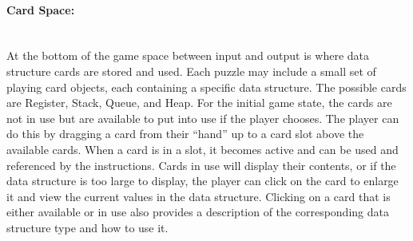 \paragraph{Card Space:} ~\\
At the bottom of the game space between input and output is where data structure cards 
are stored and used. Each puzzle may include a small set of playing card objects, each 
containing a specific data structure. The possible cards are Register, Stack, Queue, and 
Heap. For the initial game state, the cards are not in use but are available to put into use if 
the player chooses. The player can do this by dragging a card from their ``hand'' up to a 
card slot above the available cards. When a card is in a slot, it becomes active and can be 
used and referenced by the instructions. Cards in use will display their contents, or if the 
data structure is too large to display, the player can click on the card  to enlarge it and view 
the current values in the data structure. Clicking on a card that is either available or in use 
also provides a description of the corresponding data structure type and how to use it.